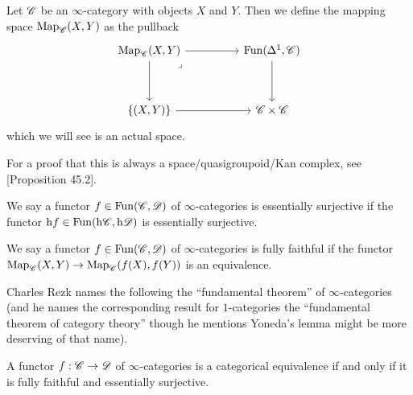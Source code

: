 \documentclass[../../thesis.tex]{subfiles}
\begin{document}
\begin{definition}
    Let $\mathscr{C}$ be an $\infty$-category with objects $X$ and $Y$.
    Then we define the mapping space $\mathrm{Map}_{\mathscr{C}}(X,Y)$ as the pullback
    \[\begin{tikzcd}
            {\map_{\C}(X,Y)} && {\Fun(\Delta^1,\C)} \\
            \\
            {\{(X,Y)\}} && \C\times\C
            \arrow[from=1-1, to=1-3]
            \arrow[from=1-3, to=3-3]
            \arrow[from=3-1, to=3-3]
            \arrow[from=1-1, to=3-1]
            \arrow["\lrcorner"{anchor=center, pos=0.125}, draw=none, from=1-1, to=3-3]
        \end{tikzcd}\]
    which we will see is an actual space.
\end{definition}
For a proof that this is always a space/quasigroupoid/Kan complex, see \cite{Rezk}[Proposition 45.2].
\begin{definition}
    We say a functor $f \in \mathrm{Fun}(\mathscr{C},\mathscr{D})$ of $\infty$-categories is essentially surjective if the functor ${\mathrm{h} f \in \mathrm{Fun}(\mathrm{h}\mathscr{C}, \mathrm{h}\mathscr{D})}$ is essentially surjective.
\end{definition}
\begin{definition}
    We say a functor $f \in \mathrm{Fun}(\mathscr{C},\mathscr{D})$ of $\infty$-categories is fully faithful if the functor ${\mathrm{Map}_{\mathscr{C}}(X,Y) \to \mathrm{Map}_{\mathscr{C}}(f(X),f(Y))}$ is an equivalence.
\end{definition}
Charles Rezk names the following the ``fundamental theorem'' of $\infty$-categories (and he names the corresponding result for $1$-categories the ``fundamental theorem of category theory'' though he mentions Yoneda's lemma might be more deserving of that name).
\begin{theorem}
    A functor $f : \mathscr{C} \to \mathscr{D}$ of $\infty$-categories is a categorical equivalence if and only if it is fully faithful and essentially surjective.
\end{theorem}
\end{document}
